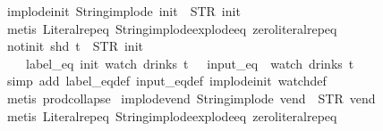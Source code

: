 \begin{isabellebody}
\endisatagproof
{\isafoldproof}%
%
\isadelimproof
\isanewline
%
\endisadelimproof
\isanewline
{}\isamarkupfalse%
\ implode{\isacharunderscore}init{\isacharcolon}\ {\isachardoublequoteopen}String{\isachardot}implode\ {\isacharprime}{\isacharprime}init{\isacharprime}{\isacharprime}\ {\isacharequal}\ STR\ {\isacharprime}{\isacharprime}init{\isacharprime}{\isacharprime}{\isachardoublequoteclose}\isanewline
%
\isadelimproof
\ \ %
\endisadelimproof
%
\isatagproof
{}\isamarkupfalse%
\ {\isacharparenleft}metis\ Literal{\isachardot}rep{\isacharunderscore}eq\ String{\isachardot}implode{\isacharunderscore}explode{\isacharunderscore}eq\ zero{\isacharunderscore}literal{\isachardot}rep{\isacharunderscore}eq{\isacharparenright}%
\endisatagproof
{\isafoldproof}%
%
\isadelimproof
\isanewline
%
\endisadelimproof
\isanewline
{}\isamarkupfalse%
\ not{\isacharunderscore}init{\isacharcolon}\ {\isachardoublequoteopen}shd\ t\ {\isasymnoteq}\ {\isacharparenleft}STR\ {\isacharprime}{\isacharprime}init{\isacharprime}{\isacharprime}{\isacharcomma}\ {\isacharbrackleft}{\isacharbrackright}{\isacharparenright}\ {\isasymLongrightarrow}\isanewline
\ \ \ \ label_eq\ {\isacharprime}{\isacharprime}init{\isacharprime}{\isacharprime}\ {\isacharparenleft}watch\ drinks\ t{\isacharparenright}\ {\isasymLongrightarrow}\ {\isasymnot}\ input_eq\ {\isacharbrackleft}{\isacharbrackright}\ {\isacharparenleft}watch\ drinks\ t{\isacharparenright}{\isachardoublequoteclose}\isanewline
%
\isadelimproof
\ \ %
\endisadelimproof
%
\isatagproof
{}\isamarkupfalse%
\ {\isacharparenleft}simp\ add{\isacharcolon}\ label_eq{\isacharunderscore}def\ input_eq{\isacharunderscore}def\ implode{\isacharunderscore}init\ watch{\isacharunderscore}def{\isacharparenright}\isanewline
\ \ \isamarkupfalse%
\ {\isacharparenleft}metis\ prod{\isachardot}collapse{\isacharparenright}%
\endisatagproof
{\isafoldproof}%
%
\isadelimproof
\isanewline
%
\endisadelimproof
\isanewline
{}\isamarkupfalse%
\ implode{\isacharunderscore}vend{\isacharcolon}\ {\isachardoublequoteopen}String{\isachardot}implode\ {\isacharprime}{\isacharprime}vend{\isacharprime}{\isacharprime}\ {\isacharequal}\ STR\ {\isacharprime}{\isacharprime}vend{\isacharprime}{\isacharprime}{\isachardoublequoteclose}\isanewline
%
\isadelimproof
\ \ %
\endisadelimproof
%
\isatagproof
{}\isamarkupfalse%
\ {\isacharparenleft}metis\ Literal{\isachardot}rep{\isacharunderscore}eq\ String{\isachardot}implode{\isacharunderscore}explode{\isacharunderscore}eq\ zero{\isacharunderscore}literal{\isachardot}rep{\isacharunderscore}eq{\isacharparenright}%

\end{isabellebody}
